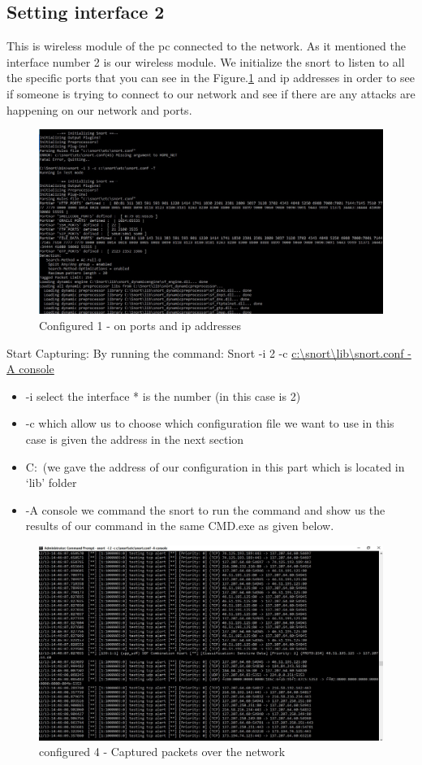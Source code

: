 \documentclass{article}
\begin{document}
\subsection{Setting interface 2}
This is wireless module of the pc connected to the network. As it mentioned the interface number 2 is our wireless module. We initialize the snort to listen to all the specific ports that you can see in the Figure.\ref{fig:Ipport} and ip addresses in order to see if someone is trying to connect to our network and see if there are any attacks are happening on our network and ports.

\begin{figure}[H]
	\begin{center}
		\includegraphics[width=0.6
			\textwidth]{portip.jpg}
	\end{center}
	\caption{Configured 1 - on ports and ip addresses}
	\label{fig:Ipport}
\end{figure}


Start Capturing:
By running the command:
Snort -i 2 -c \url{c:\snort\lib\snort.conf -A console}

\begin{itemize}
	
	\item -i select the interface * is the number (in this case is  2)
	\item -c which allow us to choose which configuration file we want to use in this case is given the address in the next section
	\item C:\ (we gave the address of our configuration in this part which is located in ‘lib’ folder
	\item -A console we command the snort to run the command and show us the results of our command in the same CMD.exe as given below. 
\end{itemize}



 


\begin{figure}[H]
	\begin{center}
		\includegraphics[width=0.6
\textwidth]{Conf4.jpg}
	\end{center}
	\caption{configured 4 - Captured packets over the network}
	\label{fig:Conf4}
\end{figure}
\end{document}
